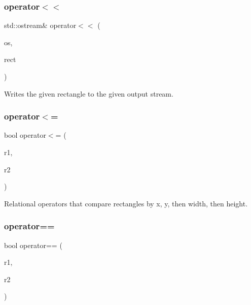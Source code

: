 \subsubsection{\texorpdfstring{operator$<$$<$}{operator<<}}
{\footnotesize\ttfamily std\+::ostream\& operator$<$$<$ (\begin{DoxyParamCaption}\item[{std\+::ostream \&}]{os,  }\item[{const \mbox{\hyperlink{classGRectangle}{G\+Rectangle}} \&}]{rect }\end{DoxyParamCaption})\hspace{0.3cm}{\ttfamily [friend]}}



Writes the given rectangle to the given output stream. 

\mbox{\label{classGRectangle_a3588a1e1157026c5ef8c0ed41ba78890}} 
\subsubsection{\texorpdfstring{operator$<$=}{operator<=}}
{\footnotesize\ttfamily bool operator$<$= (\begin{DoxyParamCaption}\item[{const \mbox{\hyperlink{classGRectangle}{G\+Rectangle}} \&}]{r1,  }\item[{const \mbox{\hyperlink{classGRectangle}{G\+Rectangle}} \&}]{r2 }\end{DoxyParamCaption})\hspace{0.3cm}{\ttfamily [friend]}}



Relational operators that compare rectangles by x, y, then width, then height. 

\mbox{\label{classGRectangle_a83a32754b7097b7c484607635114ce5e}} 
\subsubsection{\texorpdfstring{operator==}{operator==}}
{\footnotesize\ttfamily bool operator== (\begin{DoxyParamCaption}\item[{const \mbox{\hyperlink{classGRectangle}{G\+Rectangle}} \&}]{r1,  }\item[{const \mbox{\hyperlink{classGRectangle}{G\+Rectangle}} \&}]{r2 }\end{DoxyParamCaption})\hspace{0.3cm}{\ttfamily [friend]}}



